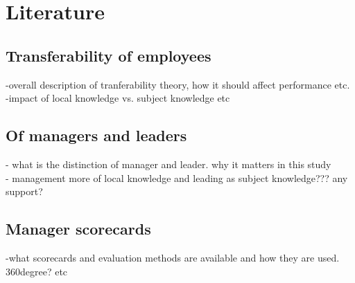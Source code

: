 \section{Literature}
\label{Literature}

\subsection{Transferability of employees}
\label{Transfrrability of employees}
-overall description of tranferability theory, how it should affect performance
etc.
\\
-impact of local knowledge vs. subject knowledge etc

\subsection{Of managers and leaders}
\label{Of managers and leaders}
- what is the distinction of manager and leader. why it matters in this study
\\
- management more of local knowledge and leading as subject knowledge??? any
support? 

\subsection{Manager scorecards}
\label{Manager scorecards}
-what scorecards and evaluation methods are available and how they are used.
360degree? etc

